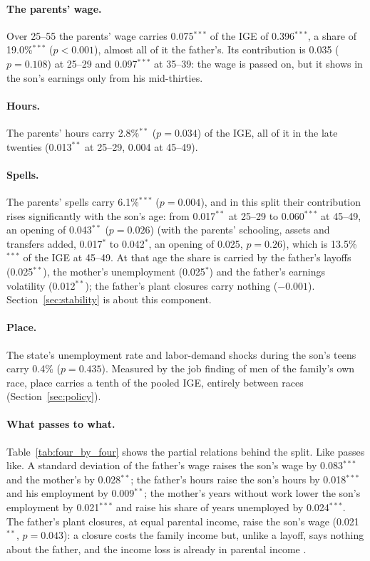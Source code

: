 

\paragraph{The parents' wage.} Over 25--55 the parents' wage carries 0.075$^{***}$ of the IGE of 0.396$^{***}$, a share
of 19.0\%$^{***}$ ($p<0.001$), almost all of it the father's. Its contribution is 0.035 ($p = 0.108$) at 25--29 and
0.097$^{***}$ at 35--39: the wage is passed on, but it shows in the son's earnings only from his mid-thirties.

\paragraph{Hours.} The parents' hours carry 2.8\%$^{**}$ ($p = 0.034$) of the IGE, all of it in the late twenties
(0.013$^{**}$ at 25--29, 0.004 at 45--49).

\paragraph{Spells.} The parents' spells carry 6.1\%$^{***}$ ($p = 0.004$), and in this split their contribution rises
significantly with the son's age: from 0.017$^{**}$ at 25--29 to 0.060$^{***}$ at 45--49, an opening of
0.043$^{**}$ ($p = 0.026$) (with the parents' schooling, assets and transfers added, 0.017$^{*}$ to 0.042$^{*}$, an
opening of 0.025, $p = 0.26$), which is 13.5\%$^{***}$ of the IGE at 45--49. At that age the share is carried by the father's
layoffs (0.025$^{**}$), the mother's unemployment (0.025$^{*}$) and the father's earnings volatility (0.012$^{**}$); the
father's plant closures carry nothing ($-0.001$). Section~\ref{sec:stability} is about this component.

\paragraph{Place.} The state's unemployment rate and labor-demand shocks during the son's teens carry 0.4\% ($p = 0.435$).
Measured by the job finding of men of the family's own race, place carries a tenth of the pooled IGE, entirely between
races (Section~\ref{sec:policy}).

\paragraph{What passes to what.} Table~\ref{tab:four_by_four} shows the partial relations behind the split. Like passes
like. A standard deviation of the father's wage raises the son's wage by 0.083$^{***}$ and the mother's by
0.028$^{**}$; the father's hours raise the son's hours by 0.018$^{***}$ and his employment by 0.009$^{**}$; the mother's
years without work lower the son's employment by 0.021$^{***}$ and raise his share of years unemployed by 0.024$^{***}$.
The father's plant closures, at equal parental income, raise the son's wage (0.021$^{**}$, $p = 0.043$): a closure costs
the family income but, unlike a layoff, says nothing about the father, and the income loss is already in parental
income \citep{gibbons1991layoffs}.

